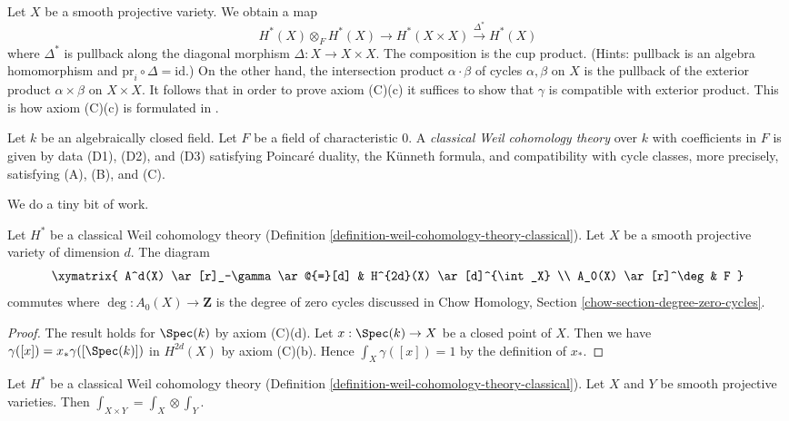 \begin{remark}
\label{remark-replace-cup-product-classical}
Let $X$ be a smooth projective variety. We obtain a map
$$
H^*(X) \otimes_F H^*(X) \longrightarrow H^*(X \times X)
\xrightarrow{\Delta^*} H^*(X)
$$
where $\Delta^*$ is pullback along the diagonal morphism
$\Delta : X \to X \times X$. The composition is the cup product.
(Hints: pullback is an algebra homomorphism and
$\text{pr}_i \circ \Delta = \text{id}$.)
On the other hand, the intersection product
$\alpha \cdot \beta$ of cycles $\alpha, \beta$ on $X$ is the
pullback of the exterior product $\alpha \times \beta$ on $X \times X$.
It follows that in order to prove axiom (C)(c) it suffices to show
that $\gamma$ is compatible with exterior product. This is how
axiom (C)(c) is formulated in \cite{Kleiman-cycles}.
\end{remark}

\begin{definition}
\label{definition-weil-cohomology-theory-classical}
Let $k$ be an algebraically closed field.
Let $F$ be a field of characteristic $0$.
A {\it classical Weil cohomology theory} over $k$ with coefficients in $F$
is given by data (D1), (D2), and (D3) satisfying
Poincar\'e duality, the K\"unneth formula, and compatibility
with cycle classes, more precisely, satisfying (A), (B), and (C).
\end{definition}

\noindent
We do a tiny bit of work.

\begin{lemma}
\label{lemma-degrees-cycles-classical}
Let $H^*$ be a classical Weil cohomology theory
(Definition \ref{definition-weil-cohomology-theory-classical}).
Let $X$ be a smooth projective variety of dimension $d$. The diagram
$$
\xymatrix{
A^d(X) \ar[r]_-\gamma \ar@{=}[d] &
H^{2d}(X) \ar[d]^{\int_X} \\
A_0(X) \ar[r]^\deg & F
}
$$
commutes where $\deg : A_0(X) \to \mathbf{Z}$ is the degree of
zero cycles discussed in Chow Homology, Section
\ref{chow-section-degree-zero-cycles}.
\end{lemma}

\begin{proof}
The result holds for $\Spec(k)$ by axiom (C)(d). Let $x : \Spec(k) \to X$
be a closed point of $X$. Then we have $\gamma([x]) = x_*\gamma([\Spec(k)])$
in $H^{2d}(X)$ by axiom (C)(b). Hence $\int_X \gamma([x]) = 1$ by the
definition of $x_*$.
\end{proof}

\begin{lemma}
\label{lemma-trace-product-classical}
Let $H^*$ be a classical Weil cohomology theory
(Definition \ref{definition-weil-cohomology-theory-classical}).
Let $X$ and $Y$ be smooth projective varieties.
Then $\int_{X \times Y} = \int_X \otimes \int_Y$.
\end{lemma}

